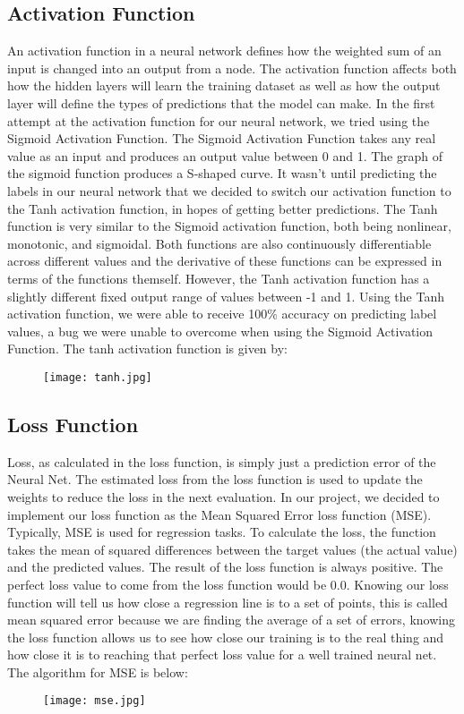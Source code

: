 \documentclass[twoside,twocolumn]{article}
\begin{document}
\subsection{Activation Function}
An activation function in a neural network defines how the weighted sum of an input is changed into an output from a node. The activation function affects both how the hidden layers will learn the training dataset as well as how the output layer will define the types of predictions that the model can make. In the first attempt at the activation function for our neural network, we tried using the Sigmoid Activation Function. The Sigmoid Activation Function takes any real value as an input and produces an output value between 0 and 1. The graph of the sigmoid function produces a S-shaped curve. It wasn’t until predicting the labels in our neural network that we decided to switch our activation function to the Tanh activation function, in hopes of getting better predictions. The Tanh function is very similar to the Sigmoid activation function, both being nonlinear, monotonic, and sigmoidal. Both functions are also continuously differentiable across different values and the derivative of these functions can be expressed in terms of the functions themself. However, the Tanh activation function has a slightly different fixed output range of values between -1 and 1. Using the Tanh activation function, we were able to receive 100\% accuracy on predicting label values, a bug we were unable to overcome when using the Sigmoid Activation Function. The tanh activation function is given by:
\begin{figure}[h]
    \centering
    \texttt{[image: tanh.jpg]}
\end{figure}

\subsection{Loss Function}
Loss, as calculated in the loss function, is simply just a prediction error of the Neural Net. The estimated loss from the loss function is used to update the weights to reduce the loss in the next evaluation. In our project, we decided to implement our loss function as the Mean Squared Error loss function (MSE). Typically, MSE is used for regression tasks. To calculate the loss, the function takes the mean of squared differences between the target values (the actual value) and the predicted values. The result of the loss function is always positive. The perfect loss value to come from the loss function would be 0.0. Knowing our loss function will tell us how close a regression line is to a set of points, this is called mean squared error because we are finding the average of a set of errors, knowing the loss function allows us to see how close our training is to the real thing and how close it is to reaching that perfect loss value for a well trained neural net. The algorithm for MSE is below:
\begin{figure}[h]
    \centering
    \texttt{[image: mse.jpg]}
\end{figure}
\end{document}
